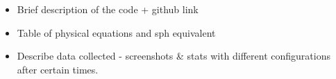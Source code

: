 \documentclass[../main.tex]{subfiles}
\begin{document}
\begin{itemize}
    \item Brief description of the code + github link
    \item Table of physical equations and sph equivalent
    \item Describe data collected - screenshots \& stats with different configurations after certain
        times.
\end{itemize}
\end{document}
